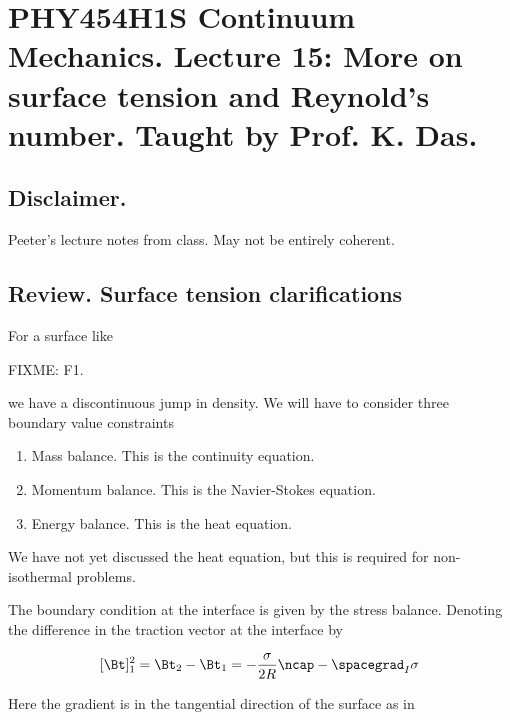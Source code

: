 
%

\chapter{PHY454H1S Continuum Mechanics.  Lecture 15: More on surface tension and Reynold's number.  Taught by Prof. K. Das.}
\label{chap:continuumL15}
{}
\date{Mar 9, 2012}

\beginArtWithToc

\section{Disclaimer.}

Peeter's lecture notes from class.  May not be entirely coherent.

\section{Review.  Surface tension clarifications}

For a surface like

FIXME: F1.

we have a discontinuous jump in density.  We will have to consider three boundary value constraints

\begin{enumerate}
\item Mass balance.  This is the continuity equation.
\item Momentum balance.  This is the Navier-Stokes equation.
\item Energy balance.  This is the heat equation.
\end{enumerate}

We have not yet discussed the heat equation, but this is required for non-isothermal problems.

The boundary condition at the interface is given by the stress balance.  Denoting the difference in the traction vector at the interface by

\begin{equation}\label{eqn:inclinedFlowWithoutConstantHeightAssumption:130}
[\Bt]_1^2 = \Bt_2 - \Bt_1 = -\frac{\sigma}{2 R} \ncap - \spacegrad_I \sigma
\end{equation}

Here the gradient is in the tangential direction of the surface as in 

